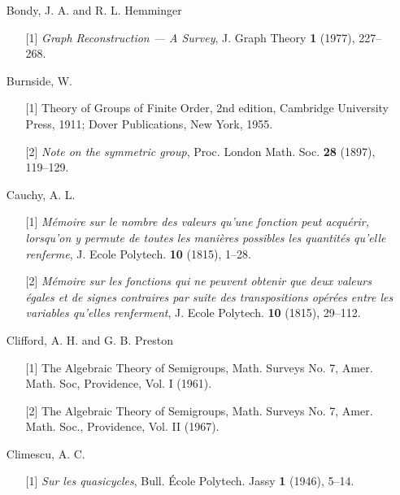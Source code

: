 \documentclass{surv-l}
\numberwithin{equation}{section}
\numberwithin{table}{section}
\numberwithin{figure}{section}
\theoremstyle{definition}
\begin{document}
\begin{enumerate}
\item[] Bondy, J. A. and R. L. Hemminger
\begin{enumerate}
\item[\hypertarget{bib6}{[1]}] \emph{Graph Reconstruction --- A Survey}, J. Graph
Theory \textbf{1} (1977), 227--268.
\end{enumerate}

\item[] Burnside, W.
\begin{enumerate}
\item[\hypertarget{bib6}{[1]}] Theory of Groups of Finite Order, 2nd edition, Cambridge
University Press, 1911; Dover Publications, New York,
1955.

\item[\hypertarget{bib6a}{[2]}] \emph{Note on the symmetric group}, Proc. London Math.
Soc. \textbf{28} (1897), 119--129.
\end{enumerate}

\item[] Cauchy, A. L.
\begin{enumerate}
\item[\hypertarget{bib7}{[1]}] \emph{M\'{e}moire sur le nombre des valeurs qu'une fonction peut acqu\'{e}rir, lorsqu'on y permute
de toutes les mani\`{e}res possibles les quantit\'{e}s
qu'elle renferme}, J. Ecole Polytech. \textbf{10} (1815),
1--28.

\item[\hypertarget{bib7a}{[2]}] \emph{M\'{e}moire sur les fonctions qui ne peuvent
obtenir que deux valeurs \'{e}gales et de signes
contraires par suite des transpositions op\'{e}r\'{e}es
entre les variables qu'elles renferment}, J. Ecole
Polytech. \textbf{10} (1815), 29--112.
\end{enumerate}

\item[] Clifford, A. H. and G. B. Preston
\begin{enumerate}
\item[\hypertarget{bib8}{[1]}] The Algebraic Theory of Semigroups, Math. Surveys No. 7,
Amer. Math. Soc, Providence, Vol. I (1961).

\item[\hypertarget{bib8a}{[2]}] The Algebraic Theory of Semigroups, Math. Surveys No. 7,
Amer. Math. Soc., Providence, Vol. II (1967).
\end{enumerate}

\item[] Climescu, A. C.
\begin{enumerate}
\item[\hypertarget{bib9}{[1]}] \emph{Sur les quasicycles}, Bull. \'{E}cole Polytech.
Jassy \textbf{1} (1946), 5--14.
\end{enumerate}


\end{enumerate}
\end{document}

